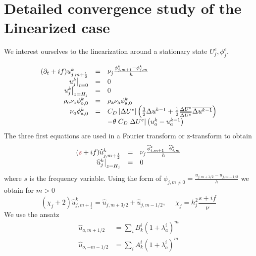 \section{Detailed convergence study of the Linearized case}
\label{appendix:OASchwarz_LinearizedAnalysis}
We interest ourselves to the linearization around a stationary state 
$U^e_j, \phi^e_j$.

\begin{equation*}
\begin{array}{rcll}
	(\partial_t +if) u^{{k}}_{j,m+\frac{1}{2}} &=&
	\nu_j\frac{\phi^{{k}}_{j,m+1} - \phi^{{k}}_{j,m}}{h} \\
	\left.u^{{k}}_j\right|_{t=0} &=& 0 \\
	\left.u^{{k}}_j\right|_{z=H_j} &=& 0\\
	\rho_{\rm o} \nu_{\rm o} \phi^{{k}}_{{\rm o}, 0} &=&
	\rho_{\rm a} \nu_{\rm a} \phi^{{k}}_{{\rm a}, 0} \\
	\nu_a \phi_{{\rm a},0}^{{k}}
	&=& C_D \left|\Delta U^e\right| \left(\frac{3}{2} \Delta u^{
		{k-1}}
	+ \frac{1}{2} \frac{\Delta U^e}{\overline{\Delta U^e}}
		\overline{\Delta u^{
			{{k-1}}}}\right) \\
		&&-{\theta \; C_D|\Delta U^e|
		\left( u_a^{{k}} -
		u_a^{{k-1}}\right)}
\end{array}
\end{equation*}
The three first equations are used in a Fourier transform or
z-transform to obtain
\begin{equation}
\label{eq:FourierTransform}
\begin{array}{rcll}
	(\emphase{s} +if) \widehat{u}^{{k}}_{j,m+\frac{1}{2}} &=&
	\nu_j\frac{\widehat{\phi}^{{k}}_{j,m+1}
	- \widehat{\phi}^{{k}}_{j,m}}{h} \\
	\left.\widehat{u}^{{k}}_j\right|_{z=H_j} &=& 0\\
\end{array}
\end{equation}
where $s$ is the frequency variable.
Using the form of $\phi_{j, m \neq 0} = \frac{u_{j, m+1/2} -
u_{j, m-1/2}}{h}$
we obtain for $m>0$
\begin{equation}
\label{eq:diff_finies_on_u}
	(\chi_j+2) \widehat{u}^{{k}}_{j,m+\frac{1}{2}} =
	\widehat{u}_{j, m+3/2} + \widehat{u}_{j, m-1/2},
	~~~~~~ \chi_j = h_j^2\frac{s + if}{\nu}
\end{equation}
We use the ansatz
\begin{equation*}
\begin{aligned}
\widehat{u}_{a,m+1/2} &= \sum_i B_k^i (1+\lambda_a^i)^m \\
\widehat{u}_{o,-m-1/2} &= \sum_i A_k^i (1+\lambda_o^i)^{m}
\end{aligned}
\end{equation*}
